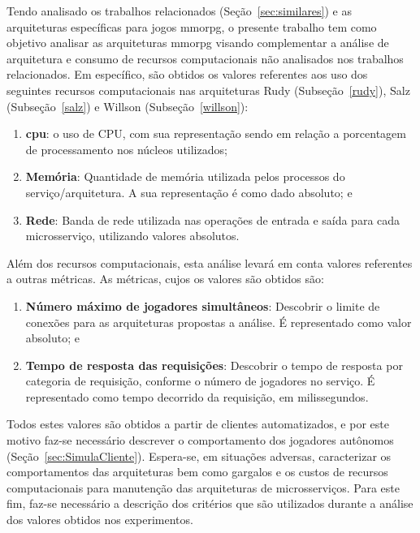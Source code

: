 Tendo analisado os trabalhos relacionados (Seção~\ref{sec:similares}) e as arquiteturas específicas para jogos \ac{mmorpg}, o presente trabalho tem como objetivo analisar as arquiteturas \ac{mmorpg} visando complementar a análise de arquitetura e consumo de recursos computacionais não analisados nos trabalhos relacionados.
%
Em específico, são obtidos os valores referentes aos uso dos seguintes recursos computacionais nas arquiteturas Rudy (Subseção~\ref{rudy}), Salz (Subseção~\ref{salz}) e Willson (Subseção~\ref{willson}):

\begin{enumerate}
  \item \textbf{\ac{cpu}}: o uso de CPU, com sua representação sendo em relação a porcentagem de processamento nos núcleos utilizados;
  \item \textbf{Memória}: Quantidade de memória utilizada pelos processos do serviço/arquitetura. A sua representação é como dado absoluto; e
  \item \textbf{Rede}: Banda de rede utilizada nas operações de entrada e saída para cada microsserviço, utilizando valores absolutos.
\end{enumerate}

Além dos recursos computacionais, esta análise levará em conta valores referentes a outras métricas.
%
As métricas, cujos os valores são obtidos são:

\begin{enumerate}
  \item \textbf{Número máximo de jogadores simultâneos}: Descobrir o limite de conexões para as arquiteturas propostas a análise. É representado como valor absoluto; e
  \item \textbf{Tempo de resposta das requisições}: Descobrir o tempo de resposta por categoria de requisição, conforme o número de jogadores no serviço. É representado como tempo decorrido da requisição, em milissegundos.
\end{enumerate}

Todos estes valores são obtidos a partir de clientes automatizados, e por este motivo faz-se necessário descrever o comportamento dos jogadores autônomos (Seção~\ref{sec:SimulaCliente}).
%
Espera-se, em situações adversas, caracterizar os comportamentos das arquiteturas bem como gargalos e os custos de recursos computacionais para manutenção das arquiteturas de microsserviços.
%
Para este fim, faz-se necessário a descrição dos critérios que são utilizados durante a análise dos valores obtidos nos experimentos.

